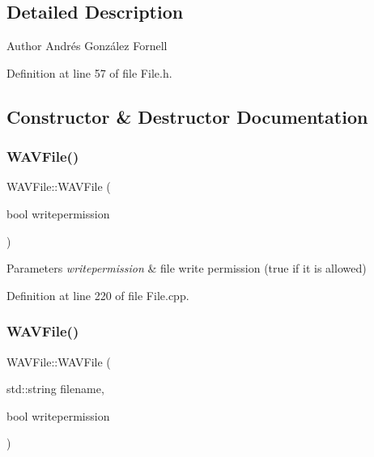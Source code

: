 \subsection{Detailed Description}
\begin{DoxyAuthor}{Author}
Andrés González Fornell 
\end{DoxyAuthor}


Definition at line 57 of file File.\+h.



\subsection{Constructor \& Destructor Documentation}
\mbox{\label{class_w_a_v_file_a135707a98d9667622ce5056b68ed9abe}} 
\subsubsection{\texorpdfstring{W\+A\+V\+File()}{WAVFile()}\hspace{0.1cm}{\footnotesize\ttfamily [1/3]}}
{\footnotesize\ttfamily W\+A\+V\+File\+::\+W\+A\+V\+File (\begin{DoxyParamCaption}\item[{bool}]{writepermission }\end{DoxyParamCaption})}


\begin{DoxyParams}{Parameters}
{\em writepermission} & file write permission (true if it is allowed) \\
\hline
\end{DoxyParams}


Definition at line 220 of file File.\+cpp.

\mbox{\label{class_w_a_v_file_adc5bd36228dd18df58f2467546f367ef}} 
\subsubsection{\texorpdfstring{W\+A\+V\+File()}{WAVFile()}\hspace{0.1cm}{\footnotesize\ttfamily [2/3]}}
{\footnotesize\ttfamily W\+A\+V\+File\+::\+W\+A\+V\+File (\begin{DoxyParamCaption}\item[{std\+::string}]{filename,  }\item[{bool}]{writepermission }\end{DoxyParamCaption})}


